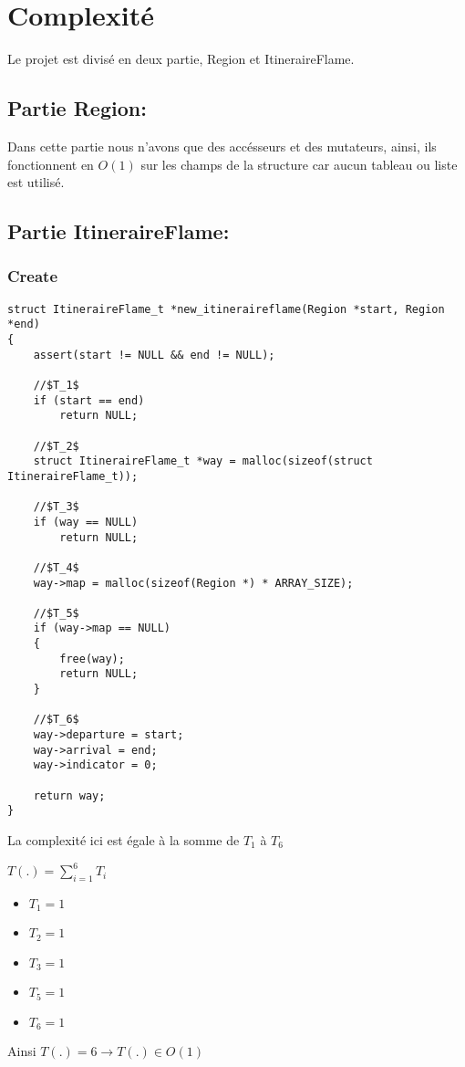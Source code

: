 \section{Complexité}\label{complexite}

\quad Le projet est divisé en deux partie, Region et ItineraireFlame.

\subsection{Partie Region:}

Dans cette partie nous n'avons que des accésseurs et des mutateurs, ainsi, ils fonctionnent
en $O(1)$ sur les champs de la structure car aucun tableau ou liste est utilisé.

\subsection{Partie ItineraireFlame:}

\subsubsection{Create}

\begin{lstlisting}
struct ItineraireFlame_t *new_itineraireflame(Region *start, Region *end)
{
    assert(start != NULL && end != NULL);

    //$T_1$
    if (start == end)
        return NULL;

    //$T_2$
    struct ItineraireFlame_t *way = malloc(sizeof(struct ItineraireFlame_t));

    //$T_3$
    if (way == NULL)
        return NULL;

    //$T_4$
    way->map = malloc(sizeof(Region *) * ARRAY_SIZE);

    //$T_5$
    if (way->map == NULL)
    {
        free(way);
        return NULL;
    }

    //$T_6$
    way->departure = start;
    way->arrival = end;
    way->indicator = 0;
    
    return way;
}
\end{lstlisting}

La complexité ici est égale à la somme de $T_1$ à $T_6$

$T(.) = \sum_{i=1}^{6} T_i$

\begin{itemize}
    \item $T_1 = 1$
    \item $T_2 = 1$
    \item $T_3 = 1$
    \item $T_5 = 1$
    \item $T_6 = 1$
\end{itemize}

Ainsi $T(.) = 6 \rightarrow T(.) \in O(1)$
